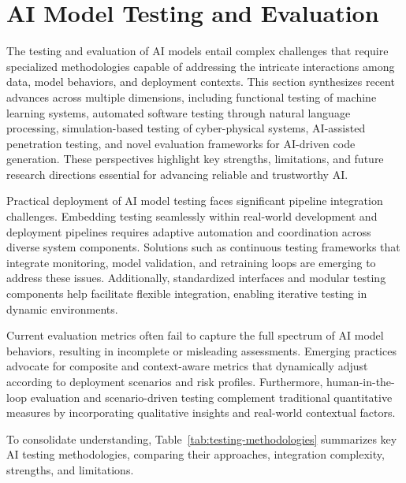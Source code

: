 \documentclass[sigconf]{acmart}
\begin{document}
\section{AI Model Testing and Evaluation}

The testing and evaluation of AI models entail complex challenges that require specialized methodologies capable of addressing the intricate interactions among data, model behaviors, and deployment contexts. This section synthesizes recent advances across multiple dimensions, including functional testing of machine learning systems, automated software testing through natural language processing, simulation-based testing of cyber-physical systems, AI-assisted penetration testing, and novel evaluation frameworks for AI-driven code generation. These perspectives highlight key strengths, limitations, and future research directions essential for advancing reliable and trustworthy AI.

Practical deployment of AI model testing faces significant pipeline integration challenges. Embedding testing seamlessly within real-world development and deployment pipelines requires adaptive automation and coordination across diverse system components. Solutions such as continuous testing frameworks that integrate monitoring, model validation, and retraining loops are emerging to address these issues. Additionally, standardized interfaces and modular testing components help facilitate flexible integration, enabling iterative testing in dynamic environments.

Current evaluation metrics often fail to capture the full spectrum of AI model behaviors, resulting in incomplete or misleading assessments. Emerging practices advocate for composite and context-aware metrics that dynamically adjust according to deployment scenarios and risk profiles. Furthermore, human-in-the-loop evaluation and scenario-driven testing complement traditional quantitative measures by incorporating qualitative insights and real-world contextual factors.

To consolidate understanding, Table~\ref{tab:testing-methodologies} summarizes key AI testing methodologies, comparing their approaches, integration complexity, strengths, and limitations.
\end{document}
